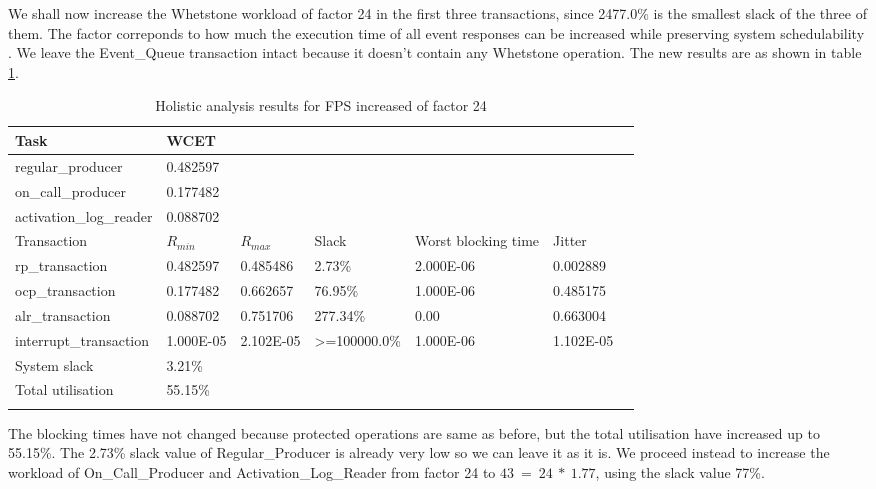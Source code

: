 \documentclass{article}
\begin{document}
We shall now increase the Whetstone workload of factor 24 in the first three transactions, since 2477.0\% is the smallest slack of the three of them. The factor correponds to how much the execution time of all event responses can be increased while preserving system schedulability \cite{practitioner-growth}. We leave the Event\_Queue transaction intact because it doesn't contain any Whetstone operation. The new results are as shown in table \ref{tab:holistic-fps-24}.

\begin{longtable}{lllllll}
   \toprule
   Task & WCET \\
   \midrule
   regular\_producer & 0.482597 \\
   on\_call\_producer & 0.177482 \\
   activation\_log\_reader & 0.088702 \\
   \toprule
   \toprule
   Transaction & $R_{min}$ & $R_{max}$ & Slack & Worst blocking time & Jitter \\
   \midrule
   rp\_transaction & 0.482597 & 0.485486  & 2.73\% &  2.000E-06 & 0.002889 \\
   ocp\_transaction & 0.177482 & 0.662657 & 76.95\% & 1.000E-06 & 0.485175 \\
   alr\_transaction & 0.088702 & 0.751706 & 277.34\% & 0.00 & 0.663004 \\
   interrupt\_transaction & 1.000E-05 & 2.102E-05 & >=100000.0\% & 1.000E-06 & 1.102E-05 \\
   \toprule
   \toprule
   System slack & 3.21\% \\
   Total utilisation & 55.15\% \\
   \bottomrule
   \caption{Holistic analysis results for FPS increased of factor 24}
\label{tab:holistic-fps-24}
\end{longtable}

The blocking times have not changed because protected operations are same as before, but the total utilisation have increased up to 55.15\%. The 2.73\% slack value of Regular\_Producer is already very low so we can leave it as it is. We proceed instead to increase the workload of On\_Call\_Producer and Activation\_Log\_Reader from factor 24 to $43\ =\ 24\ *\ 1.77$, using the slack value 77\%.
\end{document}
